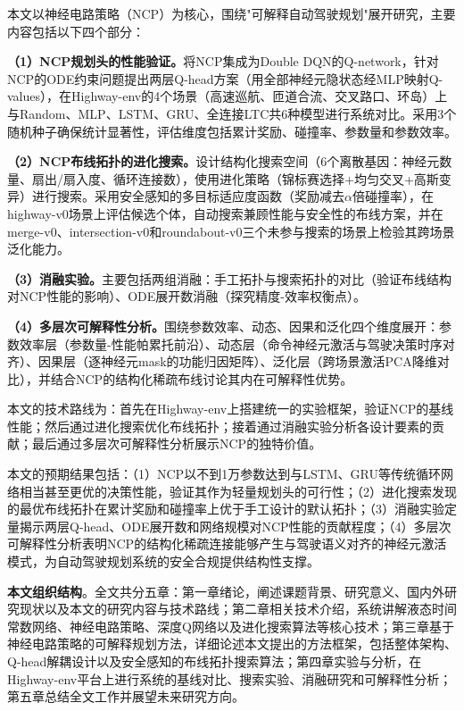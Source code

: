 \xiaosi

本文以神经电路策略（NCP）为核心，围绕"可解释自动驾驶规划"展开研究，主要内容包括以下四个部分：

\textbf{（1）NCP规划头的性能验证。}将NCP集成为Double DQN的Q-network，针对NCP的ODE约束问题提出两层Q-head方案（用全部神经元隐状态经MLP映射Q-values），在Highway-env的4个场景（高速巡航、匝道合流、交叉路口、环岛）上与Random、MLP、LSTM、GRU、全连接LTC共6种模型进行系统对比。采用3个随机种子确保统计显著性，评估维度包括累计奖励、碰撞率、参数量和参数效率。

\textbf{（2）NCP布线拓扑的进化搜索。}设计结构化搜索空间（6个离散基因：神经元数量、扇出/扇入度、循环连接数），使用进化策略（锦标赛选择+均匀交叉+高斯变异）进行搜索。采用安全感知的多目标适应度函数（奖励减去$\alpha$倍碰撞率），在highway-v0场景上评估候选个体，自动搜索兼顾性能与安全性的布线方案，并在merge-v0、intersection-v0和roundabout-v0三个未参与搜索的场景上检验其跨场景泛化能力。

\textbf{（3）消融实验。}主要包括两组消融：手工拓扑与搜索拓扑的对比（验证布线结构对NCP性能的影响）、ODE展开数消融（探究精度-效率权衡点）。

\textbf{（4）多层次可解释性分析。}围绕参数效率、动态、因果和泛化四个维度展开：参数效率层（参数量-性能帕累托前沿）、动态层（命令神经元激活与驾驶决策时序对齐）、因果层（逐神经元mask的功能归因矩阵）、泛化层（跨场景激活PCA降维对比），并结合NCP的结构化稀疏布线讨论其内在可解释性优势。

本文的技术路线为：首先在Highway-env上搭建统一的实验框架，验证NCP的基线性能；然后通过进化搜索优化布线拓扑；接着通过消融实验分析各设计要素的贡献；最后通过多层次可解释性分析展示NCP的独特价值。

本文的预期结果包括：（1）NCP以不到1万参数达到与LSTM、GRU等传统循环网络相当甚至更优的决策性能，验证其作为轻量规划头的可行性；（2）进化搜索发现的最优布线拓扑在累计奖励和碰撞率上优于手工设计的默认拓扑；（3）消融实验定量揭示两层Q-head、ODE展开数和网络规模对NCP性能的贡献程度；（4）多层次可解释性分析表明NCP的结构化稀疏连接能够产生与驾驶语义对齐的神经元激活模式，为自动驾驶规划系统的安全合规提供结构性支撑。

\textbf{本文组织结构}。全文共分五章：第一章绪论，阐述课题背景、研究意义、国内外研究现状以及本文的研究内容与技术路线；第二章相关技术介绍，系统讲解液态时间常数网络、神经电路策略、深度Q网络以及进化搜索算法等核心技术；第三章基于神经电路策略的可解释规划方法，详细论述本文提出的方法框架，包括整体架构、Q-head解耦设计以及安全感知的布线拓扑搜索算法；第四章实验与分析，在Highway-env平台上进行系统的基线对比、搜索实验、消融研究和可解释性分析；第五章总结全文工作并展望未来研究方向。
